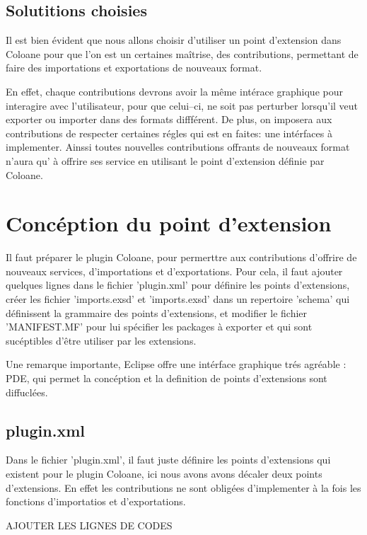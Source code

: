 \documentclass{article}
\begin{document}
\subsection{Solutitions choisies}
Il est bien évident que nous allons choisir d'utiliser un point d'extension dans 
Coloane pour que l'on est un certaines maîtrise, des contributions, permettant 
de faire des importations et exportations de nouveaux format.

En effet, chaque contributions devrons avoir la même intérace graphique pour 
interagire avec l'utilisateur, pour que celui--ci, ne soit pas perturber 
lorsqu'il veut exporter ou importer dans des formats diffférent. De plus, on 
imposera aux contributions de respecter certaines régles qui est en faites: 
une intérfaces à implementer. Ainssi toutes nouvelles contributions offrants de 
nouveaux format n'aura qu' à offrire ses service en utilisant le point 
d'extension définie par Coloane.

\newpage

\section{Concéption du point d'extension}
Il faut préparer le plugin Coloane, pour permerttre aux contributions d'offrire 
de nouveaux services, d'importations et d'exportations. Pour cela, il faut 
ajouter quelques lignes dans le fichier 'plugin.xml' pour définire les points 
d'extensions, créer les fichier 'imports.exsd' et 'imports.exsd' dans un 
repertoire 'schema' qui définissent la grammaire des points d'extensions, et 
modifier le fichier 'MANIFEST.MF' pour lui spécifier les packages à exporter et 
qui sont sucéptibles d'être utiliser par les extensions.

Une remarque importante, Eclipse offre une intérface graphique trés agréable : 
PDE, qui permet  la concéption et la definition de points d'extensions sont 
diffuclées.

\subsection{plugin.xml}
Dans le fichier 'plugin.xml', il faut juste définire les points d'extensions 
qui existent pour le plugin Coloane, ici nous avons avons décaler deux points
d'extensions. En effet les contributions ne sont obligées d'implementer à la fois 
les fonctions d'importatios et d'exportations.

AJOUTER LES LIGNES DE CODES
\end{document}
